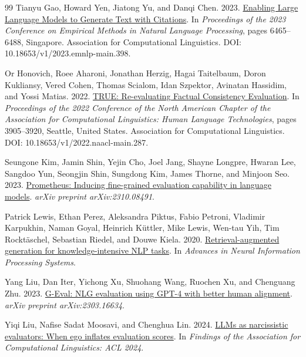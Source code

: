 \begin{thebibliography}{99}
Tianyu Gao, Howard Yen, Jiatong Yu, and Danqi Chen. 2023.
\newblock \href{https://aclanthology.org/2023.emnlp-main.398/}{Enabling Large Language Models to Generate Text with Citations}.
\newblock In \emph{Proceedings of the 2023 Conference on Empirical Methods in Natural Language Processing}, pages 6465--6488, Singapore. Association for Computational Linguistics. DOI: 10.18653/v1/2023.emnlp-main.398.

Or Honovich, Roee Aharoni, Jonathan Herzig, Hagai Taitelbaum, Doron Kukliansy, Vered Cohen, Thomas Scialom, Idan Szpektor, Avinatan Hassidim, and Yossi Matias. 2022.
\newblock \href{https://aclanthology.org/2022.naacl-main.287/}{TRUE: Re-evaluating Factual Consistency Evaluation}.
\newblock In \emph{Proceedings of the 2022 Conference of the North American Chapter of the Association for Computational Linguistics: Human Language Technologies}, pages 3905--3920, Seattle, United States. Association for Computational Linguistics. DOI: 10.18653/v1/2022.naacl-main.287.

Seungone Kim, Jamin Shin, Yejin Cho, Joel Jang, Shayne Longpre, Hwaran Lee, Sangdoo Yun, Seongjin Shin, Sungdong Kim, James Thorne, and Minjoon Seo. 2023.
\newblock \href{https://arxiv.org/abs/2310.08491}{Prometheus: Inducing fine-grained evaluation capability in language models}.
\newblock \emph{arXiv preprint arXiv:2310.08491}.

Patrick Lewis, Ethan Perez, Aleksandra Piktus, Fabio Petroni, Vladimir Karpukhin, Naman Goyal, Heinrich K{\"u}ttler, Mike Lewis, Wen-tau Yih, Tim Rockt{\"a}schel, Sebastian Riedel, and Douwe Kiela. 2020.
\newblock \href{https://proceedings.neurips.cc/paper/2020/hash/6b493230-Abstract.html}{Retrieval-augmented generation for knowledge-intensive NLP tasks}.
\newblock In \emph{Advances in Neural Information Processing Systems}.

Yang Liu, Dan Iter, Yichong Xu, Shuohang Wang, Ruochen Xu, and Chenguang Zhu. 2023.
\newblock \href{https://arxiv.org/abs/2303.16634}{G-Eval: NLG evaluation using GPT-4 with better human alignment}.
\newblock \emph{arXiv preprint arXiv:2303.16634}.

Yiqi Liu, Nafise Sadat Moosavi, and Chenghua Lin. 2024.
\newblock \href{https://aclanthology.org/2024.findings-acl.753/}{LLMs as narcissistic evaluators: When ego inflates evaluation scores}.
\newblock In \emph{Findings of the Association for Computational Linguistics: ACL 2024}.


\end{thebibliography}
